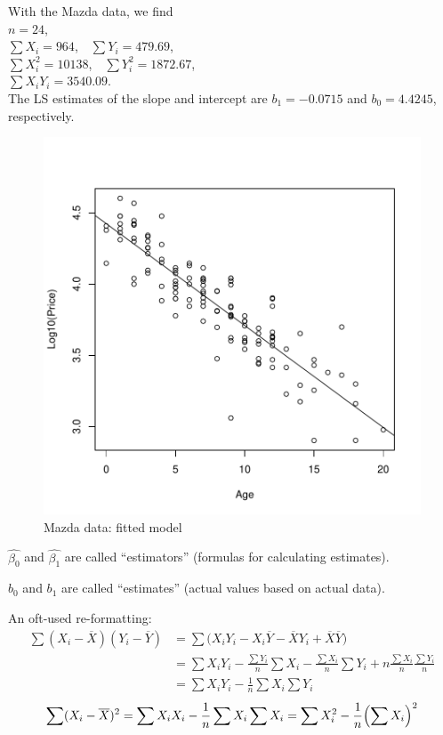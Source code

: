 \documentclass[12pt]{article}
\begin{document}
With the Mazda data, we find\\
\hspace*{1cm}$n = 24$,\\
\hspace*{1cm}$\sum X_i = 964$,\ \  $\sum Y_i = 479.69$,\\
\hspace*{1cm}$\sum X_i^2 = 10138$,\ \  $\sum Y_i^2 = 1872.67$,\\
\hspace*{1cm}$\sum X_iY_i = 3540.09$.\\
The LS estimates of the slope and intercept are
$b_1 = -0.0715$ and $b_0 = 4.4245$, respectively.

\begin{figure}
\begin{center}
\includegraphics[width=.5\textwidth]{fig_mazda_log_fit.pdf}
\caption{Mazda data: fitted model}
\label{fig:mazda-fitted}
\end{center}
\end{figure}

$\hat{\beta_0}$ and $\hat{\beta_1}$ are called ``estimators''
(\ie formulas for calculating estimates).

$b_0$ and $b_1$ are called ``estimates''
(\ie actual values based on actual data).

\hrulefill

An oft-used re-formatting:
\[\begin{split}
\sum(X_i - \overline{X})(Y_i - \overline{Y})
&= \sum \bigl(X_iY_i - X_i\overline{Y} - \overline{X}Y_i +
    \overline{X}\overline{Y}\bigr)
\\
&= \sum X_iY_i - \frac{\sum Y_i}{n} \sum X_i
    - \frac{\sum X_i}{n} \sum Y_i
    + n\frac{\sum X_i}{n} \frac{\sum Y_i}{n}
\\
&= \sum X_iY_i - \frac{1}{n}\sum X_i \sum Y_i
\end{split}
\]
\[
\begin{split}
\sum (X_i - \overline{X})^2
= \sum X_i X_i - \frac{1}{n}\sum X_i \sum X_i
= \sum X_i^2 - \frac{1}{n} \Bigl(\sum X_i\Bigr)^2
\end{split}
\]
\end{document}
